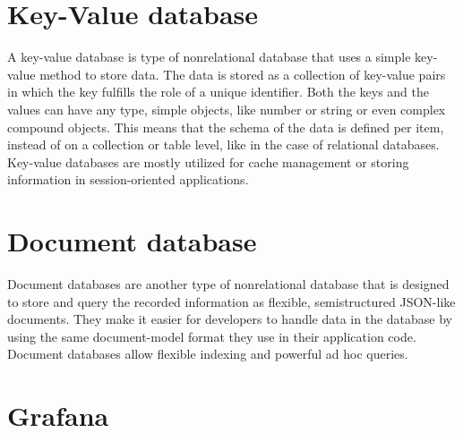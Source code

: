 \section{Key-Value database}


A key-value database is type of nonrelational database that uses a simple key-value method to store data. The data is stored as a collection of key-value pairs in which the key fulfills the role of a unique identifier. Both the keys and the values can have any type, simple objects, like number or string or even complex compound objects. This means that the schema of the data is defined per item, instead of on a collection or table level, like in the case of relational databases. Key-value databases are mostly utilized for cache management or storing information in session-oriented applications. \cite{keyvalue-database-aws}

\section{Document database}


Document databases are another type of nonrelational database that is designed to store and query the recorded information as flexible, semistructured JSON-like documents. They make it easier for developers to handle data in the database by using the same document-model format they use in their application code. Document databases allow flexible indexing and powerful ad hoc queries. \cite{document-database-aws}



\section{Grafana}

